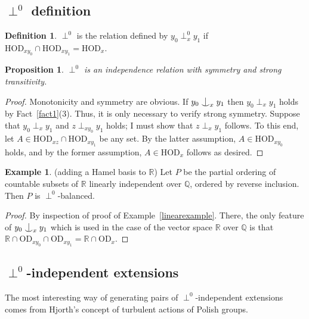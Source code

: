 \documentclass{article}
\newcommand{\hvd}{\mathrm{HOD}}
\newcommand{\vd}{\mathrm{OD}}
\newcommand{\forkindep}[1][]{%
  \mathrel{
    \mathop{
      \vcenter{
        \hbox{\oalign{\noalign{\kern-.3ex}\hfil$\vert$\hfil\cr
              \noalign{\kern-.7ex}
              $\smile$\cr\noalign{\kern-.3ex}}}
      }
    }\displaylimits_{#1}
  }
}
\newtheorem{proposition}[theorem]{Proposition}
\theoremstyle{definition}
\newtheorem{definition}[theorem]{Definition}
\newtheorem{example}[theorem]{Example}
\begin{document}
\subsection{$\perp^0$ definition}

\begin{definition}
$\perp^0$ is the relation defined by $y_0\perp^0_xy_1$ if $\hvd_{xy_0}\cap\hvd_{xy_1}=\hvd_x$.
\end{definition}

\begin{proposition}
$\perp^0$ is an independence relation with symmetry and strong transitivity.
\end{proposition}

\begin{proof}
Monotonicity and symmetry are obvious. If $y_0\forkindep[x]y_1$ then $y_0\perp_xy_1$ holds by Fact~\ref{fact1}(3). Thus, it is only necessary to verify strong symmetry. Suppose that $y_0\perp_x y_1$ and $z\perp_{xy_0}y_1$ holds; I must show that $z\perp_xy_1$ follows. To this end, let $A\in\hvd_{xz}\cap\hvd_{xy_1}$ be any set. By the latter assumption, $A\in\hvd_{xy_0}$ holds, and by the former assumption, $A\in\hvd_x$ follows as desired.
\end{proof}

\begin{example}
\label{hamelexample}
(adding a Hamel basis to $\mathbb{R}$)
Let $P$ be the partial ordering of countable subsets of $\mathbb{R}$ linearly independent over $\mathbb{Q}$, ordered by reverse inclusion. Then $P$ is $\perp^0$-balanced.
\end{example}

\begin{proof}
By inspection of proof of Example~\ref{linearexample}. There, the only feature of $y_0\forkindep[x]y_1$ which is used in the case of the vector space $\mathbb{R}$ over $\mathbb{Q}$ is that $\mathbb{R}\cap\vd_{xy_0}\cap\vd_{xy_1}=\mathbb{R}\cap\vd_x$.
\end{proof}

\subsection{$\perp^0$-independent extensions}

\noindent The most interesting way of generating pairs of $\perp^0$-independent extensions comes from Hjorth's concept of turbulent actions of Polish groups.
\end{document}
